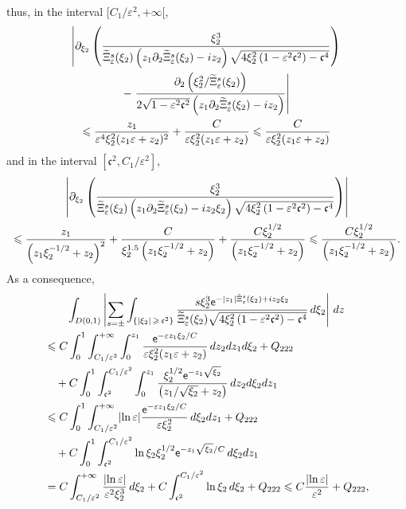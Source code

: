 \documentclass[10pt]{amsart}
\theoremstyle{definition}\newtheorem{defi}[theo]{Definition}\newtheorem{rema}[theo]{Remark}\newtheorem{exam}[theo]{Example}\newtheorem{exem}[theo]{Example}\newtheorem{nota}[theo]{Notation}
\newcommand*\p{\partial}
\newcommand*\ex{{\sf e}}
\newcommand*\cs{{\mathfrak c}}
\newcommand*\ii{\infty}
\newcommand*\gs{\geqslant }
\newcommand*\ls{\leqslant }
\newcommand*\e{\varepsilon}
\renewcommand*\t{\tilde}
\let\oldtilde\tilde
\renewcommand*{\tilde}[1]{\mathchoice{\widetilde{#1}}{\widetilde{#1}}{\oldtilde{#1}}{\oldtilde{#1}}}
\begin{document}
thus, in the interval $ [C_1 / \e^{2}, +\ii [$,
\begin{multline}\label{IPPrevient3}
\left\lvert \p_{\xi_2} \left(\frac{ \xi_2^3 }{ \t\Xi_\e^s (\xi_2) \left(z_1 \p_2 \t\Xi_\e^s (\xi_2) - i z_2\right) \sqrt{ 4 \xi_2^2\left(1 - \e^2 \cs^2\right) - \cs^4}} \right)\right.
\\
-\left. \frac{ \p_2 \left(\xi_2^2 / \t\Xi_\e^s (\xi_2)\right)}{2 \sqrt{ 1 - \e^2 \cs^2 }\left(z_1 \p_2 \t\Xi_\e^s (\xi_2) - i z_2\right)} \right\rvert\\ 
\ls \frac{ z_1 }{ \e^4 \xi_2^2 (z_1 \e + z_2)^2 } + \frac{ C }{ \e \xi_2^2 (z_1 \e + z_2) }
\ls \frac{ C }{ \e \xi_2^2(z_1 \e + z_2) }
\end{multline}
and in the interval $ [\cs^2, C_1/\e^{2}] $,
\begin{multline*}
\left\lvert \p_{\xi_2} \left(\frac{ \xi_2^3 }{ \t\Xi_\e^s (\xi_2)\left(z_1 \p_2 \t\Xi_\e^s (\xi_2) - i z_2 \xi_2\right) \sqrt{ 4 \xi_2^2 \left(1 - \e^2 \cs^2\right) - \cs^4}}
\right)\right\rvert
\\
\ls \frac{ z_1 }{\left(z_1 \xi_2^{-1/2} + z_2\right)^2 } + \frac{ C }{ \xi_2^{1.5} \left(z_1 \xi_2^{-1/2} + z_2\right) } + \frac{ C \xi_2^{1/2} }{\left(z_1 \xi_2^{-1/2} + z_2\right)}
\ls \frac{ C \xi_2^{1/2} }{\left(z_1 \xi_2^{-1/2} + z_2\right)}.
\end{multline*}
As a consequence,
\begin{multline*}
\int_{D(0,1)}  \left\lvert \sum_{s =\pm } \int_{\left\{ |\xi_2 |\,\gs\,\cs^{2}\right\}} \frac{ s \xi_2^3 \ex^{- |z_1| \t\Xi_\e^s (\xi_2) + i z_2 \xi_2} }{
\t\Xi_\e^s (\xi_2) \sqrt{4 \xi_2^2\left(1 - \e^2 \cs^2\right) - \cs^4}} \, d\xi_2 \right\rvert \, dz
\\
\begin{aligned}
& \ls C \int_0^1 \int_{ C_1 / \e^{2} }^{+\ii} \int_0^{z_1}
\frac{ \ex^{- \e z_1 \xi_2 /C } }{ \e \xi_2^2 (z_1 \e + z_2) } \, dz_2 dz_1 d\xi_2 + Q_{222}
\\ &\quad + C \int_0^1 \int_{\cs^2}^{ C_1 / \e^{2} } \int_0^{z_1}
\frac{ \xi_2^{1/2} \ex^{- z_1 \sqrt{\xi_2}} }{ \left(z_1 / \sqrt{\xi_2} + z_2\right) } \, dz_2 d\xi_2 dz_1
\\ &
\ls C \int_0^1 \int_{ C_1 /\e^{2} }^{+\ii}
\lvert \ln \e \rvert \frac{ \ex^{- \e z_1 \xi_2 /C } }{ \e \xi_2^2 }\, d \xi_2 dz_1 + Q_{222}
\\ & \quad + C \int_0^1 \int_{\cs^2}^{ C_1 / \e^{2} }
\ln \xi_2 \xi_2^{1/2} \ex^{- z_1 \sqrt{\xi_2} /C } \, d\xi_2 dz_1
\\
& = C \int_{C_1/ \e^{2} }^{+\ii}
\frac{ \lvert \ln \e \rvert}{\e^2 \xi_2^3 } \, d \xi_2 + C \int_{\cs^2}^{ C_1 / \e^{2} }
\ln \xi_2 \, d\xi_2 + Q_{222}
\ls C \frac{ \lvert \ln \e \rvert }{ \e^2 } + Q_{222},
\end{aligned}
\end{multline*}
\end{document}
